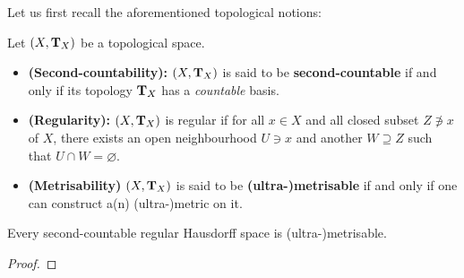                 Let us first recall the aforementioned topological notions:
                \begin{definition}
                    Let $(X, \mathbf{T}_X)$ be a topological space.
                        \begin{itemize}
                            \item \textbf{(Second-countability):} $(X, \mathbf{T}_X)$ is said to be \textbf{second-countable} if and only if its topology $\mathbf{T}_X$ has a \textit{countable} basis.
                            \item \textbf{(Regularity):} $(X, \mathbf{T}_X)$ is regular if for all $x \in X$ and all closed subset $Z \not \ni x$ of $X$, there exists an open neighbourhood $U \ni x$ and another $W \supseteq Z$ such that $U \cap W = \varnothing$.
                            \item \textbf{(Metrisability)} $(X, \mathbf{T}_X)$ is said to be \textbf{(ultra-)metrisable} if and only if one can construct a(n) (ultra-)metric on it.
                        \end{itemize}
                \end{definition}
                \begin{theorem} \label{theorem: urysohn_metrisation_theorem}
                    Every second-countable regular Hausdorff space is (ultra-)metrisable.
                \end{theorem}
                    \begin{proof}
                        
                    \end{proof}
                
